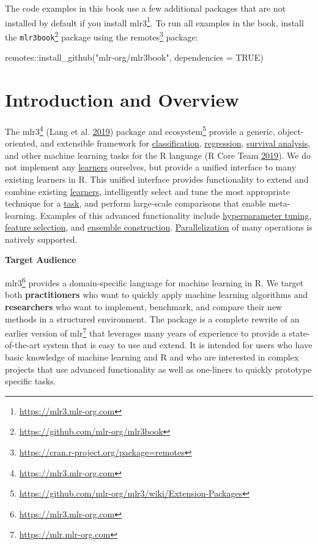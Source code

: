 \documentclass[12pt,]{scrbook}
\newenvironment{Shaded}{}{}
\newcommand{\DataTypeTok}[1]{#1}
\newcommand{\KeywordTok}[1]{\textcolor[rgb]{0.00,0.00,1.00}{#1}}
\newcommand{\NormalTok}[1]{#1}
\newcommand{\OperatorTok}[1]{#1}
\newcommand{\OtherTok}[1]{\textcolor[rgb]{1.00,0.25,0.00}{#1}}
\newcommand{\StringTok}[1]{\textcolor[rgb]{0.00,0.50,0.50}{#1}}
\renewcommand{\href}[2]{#2\footnote{\url{#1}}}
\begin{document}
The code examples in this book use a few additional packages that are not installed by default if you install \href{https://mlr3.mlr-org.com}{mlr3}.
To run all examples in the book, install the \href{https://github.com/mlr-org/mlr3book}{\texttt{mlr3book}} package using the \href{https://cran.r-project.org/package=remotes}{remotes} package:

\begin{Shaded}
\begin{Highlighting}[]
\NormalTok{remotes}\OperatorTok{::}\KeywordTok{install_github}\NormalTok{(}\StringTok{"mlr-org/mlr3book"}\NormalTok{, }\DataTypeTok{dependencies =} \OtherTok{TRUE}\NormalTok{)}
\end{Highlighting}
\end{Shaded}

\hypertarget{introduction-and-overview}{%
\chapter{Introduction and Overview}\label{introduction-and-overview}}

The \href{https://mlr3.mlr-org.com}{mlr3} (Lang et al. \protect\hyperlink{ref-mlr3}{2019}) package and \href{https://github.com/mlr-org/mlr3/wiki/Extension-Packages}{ecosystem} provide a generic, object-oriented, and extensible framework for \protect\hyperlink{tasks}{classification}, \protect\hyperlink{tasks}{regression}, \protect\hyperlink{survival}{survival analysis}, and other machine learning tasks for the R language (R Core Team \protect\hyperlink{ref-R}{2019}).
We do not implement any \protect\hyperlink{learners}{learners} ourselves, but provide a unified interface to many existing learners in R.
This unified interface provides functionality to extend and combine existing \protect\hyperlink{learners}{learners}, intelligently select and tune the most appropriate technique for a \protect\hyperlink{tasks}{task}, and perform large-scale comparisons that enable meta-learning.
Examples of this advanced functionality include \protect\hyperlink{tuning}{hyperparameter tuning}, \protect\hyperlink{fs}{feature selection}, and \protect\hyperlink{fs-ensemble}{ensemble construction}. \protect\hyperlink{parallelization}{Parallelization} of many operations is natively supported.

\textbf{Target Audience}

\href{https://mlr3.mlr-org.com}{mlr3} provides a domain-specific language for machine learning in R.
We target both \textbf{practitioners} who want to quickly apply machine learning algorithms and \textbf{researchers} who want to implement, benchmark, and compare their new methods in a structured environment.
The package is a complete rewrite of an earlier version of \href{https://mlr.mlr-org.com}{mlr} that leverages many years of experience to provide a state-of-the-art system that is easy to use and extend.
It is intended for users who have basic knowledge of machine learning and R and who are interested in complex projects that use advanced functionality as well as one-liners to quickly prototype specific tasks.
\end{document}
